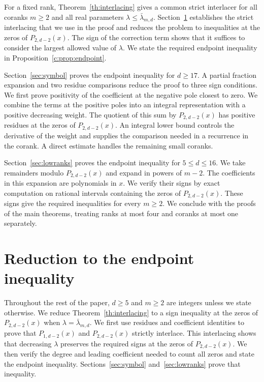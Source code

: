 \documentclass[10pt,a4paper]{article}
\numberwithin{equation}{section}
\theoremstyle{remark}\newtheorem{remark}[theorem]{Remark}
\begin{document}
For a fixed rank, Theorem~\ref{th:interlacing} gives a common strict
interlacer for all coranks $m\ge2$ and all real parameters
$\lambda\le\bar\lambda_{m,d}$. Section~\ref{sec:comparisons} establishes the
strict interlacing that we use in the proof and reduces the problem to
inequalities at the zeros of $P_{2,d-2}(x)$. The sign of the correction
term shows that it suffices to consider the largest allowed value of $\lambda$.
We state the required endpoint inequality in
Proposition~\ref{c:prop:endpoint}.

Section~\ref{sec:symbol} proves the endpoint inequality for $d\ge17$.
A partial fraction expansion and two residue comparisons reduce the
proof to three sign conditions. We first prove positivity of the
coefficient at the negative pole closest to zero. We combine the terms
at the positive poles into an integral representation with
a positive decreasing weight. The quotient of this sum by $P_{2,d-2}(x)$ has
positive residues at the zeros of $P_{2,d-2}(x)$. An integral lower bound
controls the derivative of the weight and supplies the comparison
needed in a recurrence in the corank. A direct estimate handles the
remaining small coranks.

Section~\ref{sec:lowranks} proves the endpoint inequality for
$5\le d\le16$. We take remainders modulo $P_{2,d-2}(x)$ and expand in powers
of $m-2$. The coefficients in this expansion are polynomials in $x$. We verify
their signs by exact computation on rational intervals containing the
zeros of $P_{2,d-2}(x)$. These signs give the required inequalities for every $m\ge2$.
We conclude with the proofs of the main theorems, treating ranks at most four
and coranks at most one separately.

\section{Reduction to the endpoint inequality}\label{sec:comparisons}

Throughout the rest of the paper, $d\ge5$ and $m\ge2$ are integers
unless we state otherwise. We reduce Theorem~\ref{th:interlacing} to a sign
inequality at the zeros of $P_{2,d-2}(x)$ when $\lambda=\bar\lambda_{m,d}$.
We first use residues and coefficient identities to prove that
$P_{1,d-2}(x)$ and $P_{2,d-2}(x)$ strictly interlace.
This interlacing shows that decreasing $\lambda$ preserves the required
signs at the zeros of $P_{2,d-2}(x)$. We then verify the degree and
leading coefficient needed to count all zeros and state the endpoint inequality.
Sections~\ref{sec:symbol} and~\ref{sec:lowranks} prove that inequality.
\end{document}
